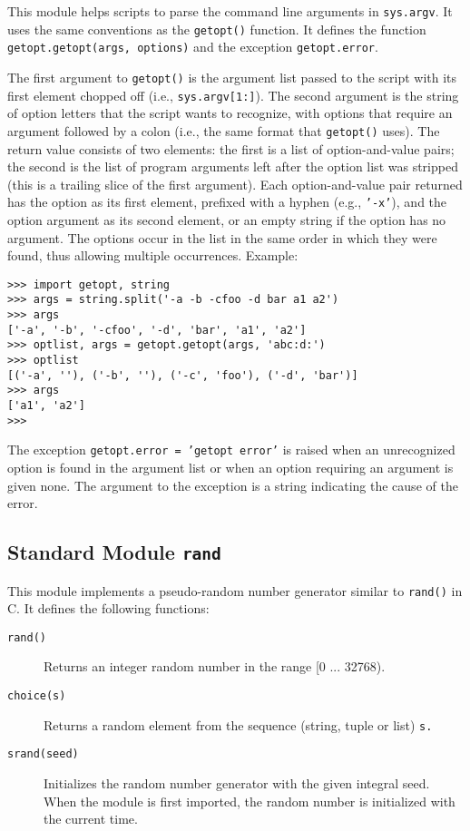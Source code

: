 This module helps scripts to parse the command line arguments in
{\tt sys.argv}.
It uses the same conventions as the {\UNIX}
{\tt getopt()}
function.
It defines the function
{\tt getopt.getopt(args, options)}
and the exception
{\tt getopt.error}.

The first argument to
{\tt getopt()}
is the argument list passed to the script with its first element
chopped off (i.e.,
{\tt sys.argv[1:]}).
The second argument is the string of option letters that the
script wants to recognize, with options that require an argument
followed by a colon (i.e., the same format that {\UNIX}
{\tt getopt()}
uses).
The return value consists of two elements: the first is a list of
option-and-value pairs; the second is the list of program arguments
left after the option list was stripped (this is a trailing slice of the
first argument).
Each option-and-value pair returned has the option as its first element,
prefixed with a hyphen (e.g.,
{\tt '-x'}),
and the option argument as its second element, or an empty string if the
option has no argument.
The options occur in the list in the same order in which they were
found, thus allowing multiple occurrences.
Example:
\bcode\begin{verbatim}
>>> import getopt, string
>>> args = string.split('-a -b -cfoo -d bar a1 a2')
>>> args
['-a', '-b', '-cfoo', '-d', 'bar', 'a1', 'a2']
>>> optlist, args = getopt.getopt(args, 'abc:d:')
>>> optlist
[('-a', ''), ('-b', ''), ('-c', 'foo'), ('-d', 'bar')]
>>> args
['a1', 'a2']
>>> 
\end{verbatim}\ecode
The exception
{\tt getopt.error = 'getopt error'}
is raised when an unrecognized option is found in the argument list or
when an option requiring an argument is given none.
The argument to the exception is a string indicating the cause of the
error.

\subsection{Standard Module {\tt rand}}

This module implements a pseudo-random number generator similar to
{\tt rand()}
in C.
It defines the following functions:
\begin{description}
\item[{\tt rand()}]
Returns an integer random number in the range [0 ... 32768).
\item[{\tt choice(s)}]
Returns a random element from the sequence (string, tuple or list)
{\tt s.}
\item[{\tt srand(seed)}]
Initializes the random number generator with the given integral seed.
When the module is first imported, the random number is initialized with
the current time.
\end{description}

